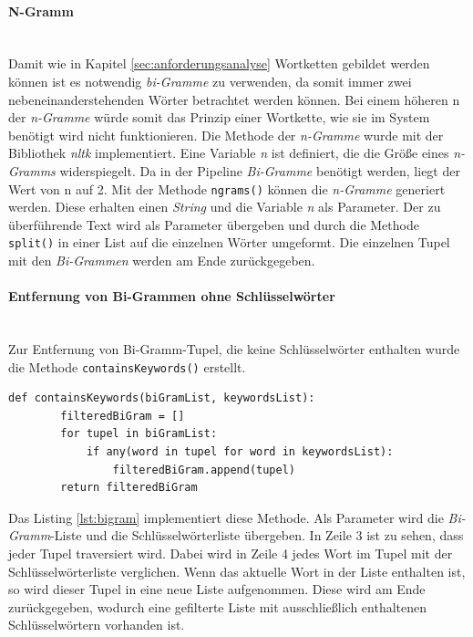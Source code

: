 \paragraph{N-Gramm}\mbox{}\\
Damit wie in Kapitel \ref{sec:anforderungsanalyse} Wortketten gebildet werden können ist es notwendig \emph{bi-Gramme} zu verwenden, da somit immer zwei nebeneinanderstehenden Wörter betrachtet werden können. Bei einem höheren n der \emph{n-Gramme} würde somit das Prinzip einer Wortkette, wie sie im System benötigt wird nicht funktionieren. Die Methode der \emph{n-Gramme} wurde mit der Bibliothek \emph{nltk} implementiert.
Eine Variable \emph{n} ist definiert, die die Größe eines \emph{n-Gramms} widerspiegelt. Da in der Pipeline \emph{Bi-Gramme} benötigt werden, liegt der Wert von n auf 2. Mit der Methode \lstinline{ngrams()}
können die \emph{n-Gramme} generiert werden. Diese erhalten einen \emph{String} und die Variable \emph{n} als Parameter. Der zu überführende Text wird als Parameter übergeben und durch die Methode \lstinline{split()}
in einer List auf die einzelnen Wörter umgeformt. Die einzelnen Tupel mit den \emph{Bi-Grammen} werden am Ende zurückgegeben.
\paragraph{Entfernung von Bi-Grammen ohne Schlüsselwörter}\mbox{}\\
Zur Entfernung von Bi-Gramm-Tupel, die keine Schlüsselwörter enthalten wurde die Methode \lstinline{containsKeywords()} erstellt.
\begin{lstlisting}[caption={Implementation der Filterung für Schlüsselwörter in einer Bi-Gramm Liste}, label=lst:bigram]
	def containsKeywords(biGramList, keywordsList):
		filteredBiGram = []
		for tupel in biGramList:
			if any(word in tupel for word in keywordsList):
				filteredBiGram.append(tupel)
		return filteredBiGram
\end{lstlisting}
Das Listing \ref{lst:bigram} implementiert diese Methode. Als Parameter wird die \emph{Bi-Gramm}-Liste und die Schlüsselwörterliste übergeben. In Zeile 3 ist zu sehen, dass jeder Tupel traversiert wird. Dabei wird in Zeile 4 jedes Wort im Tupel mit der Schlüsselwörterliste verglichen. Wenn das aktuelle Wort in der Liste enthalten ist, so wird dieser Tupel in eine neue Liste aufgenommen. Diese wird am Ende zurückgegeben, wodurch eine gefilterte Liste mit ausschließlich enthaltenen Schlüsselwörtern vorhanden ist.
